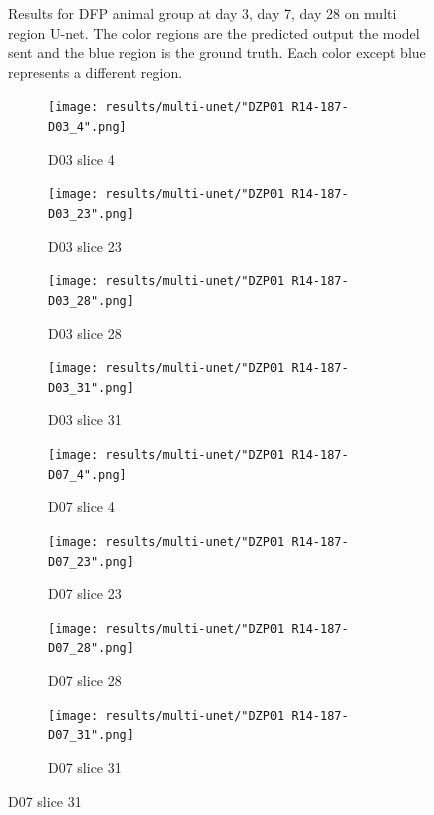 \begin{figure}[!htb]
  \caption{Results for DFP animal group at day 3, day 7, day 28 on multi region U-net. The color regions are the predicted output the model sent and the blue region is the ground truth. Each color except blue represents a different region.}
  \label{fig:results_multi_unet_DFP}
\end{figure}




\begin{figure}[!htb]  
    \centering %
\begin{subfigure}{0.25\textwidth}
  \texttt{[image: results/multi-unet/"DZP01 R14-187-D03\_4".png]}
  \caption{D03 slice 4}
\end{subfigure}\hfil %
\begin{subfigure}{0.25\textwidth}
  \texttt{[image: results/multi-unet/"DZP01 R14-187-D03\_23".png]}
  \caption{D03 slice 23}
\end{subfigure}\hfil %
\begin{subfigure}{0.25\textwidth}
  \texttt{[image: results/multi-unet/"DZP01 R14-187-D03\_28".png]}
  \caption{D03 slice 28}
\end{subfigure}\hfil %
\begin{subfigure}{0.25\textwidth}
  \texttt{[image: results/multi-unet/"DZP01 R14-187-D03\_31".png]}
  \caption{D03 slice 31}
\end{subfigure}

\medskip
\begin{subfigure}{0.25\textwidth}
  \texttt{[image: results/multi-unet/"DZP01 R14-187-D07\_4".png]}
  \caption{D07 slice 4}
\end{subfigure}\hfil %
\begin{subfigure}{0.25\textwidth}
  \texttt{[image: results/multi-unet/"DZP01 R14-187-D07\_23".png]}
  \caption{D07 slice 23}
\end{subfigure}\hfil %
\begin{subfigure}{0.25\textwidth}
  \texttt{[image: results/multi-unet/"DZP01 R14-187-D07\_28".png]}
  \caption{D07 slice 28}
\end{subfigure}\hfil %
\begin{subfigure}{0.25\textwidth}
  \texttt{[image: results/multi-unet/"DZP01 R14-187-D07\_31".png]}
  \caption{D07 slice 31}
\end{subfigure}


\end{figure}
